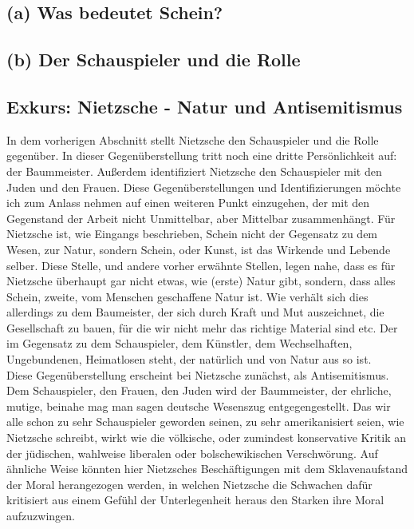 \documentclass[12pt, a4paper, openany]{report}
\begin{document}
\subsection{(a) Was bedeutet Schein?}
\subsection{(b) Der Schauspieler und die Rolle}
\subsection{Exkurs: Nietzsche - Natur und Antisemitismus}
In dem vorherigen Abschnitt stellt Nietzsche den Schauspieler und die Rolle gegenüber. 
In dieser Gegenüberstellung tritt noch eine dritte \glqq Persönlichkeit\grqq{} auf: der Baummeister. 
Außerdem identifiziert Nietzsche den Schauspieler mit den Juden und den Frauen. 
Diese Gegenüberstellungen und Identifizierungen möchte ich zum Anlass nehmen auf einen weiteren Punkt einzugehen, der mit den Gegenstand der Arbeit nicht Unmittelbar, aber Mittelbar zusammenhängt. 
Für Nietzsche ist, wie Eingangs beschrieben, Schein nicht der Gegensatz zu dem Wesen, zur Natur, sondern Schein, oder Kunst, ist das Wirkende und Lebende selber. 
Diese Stelle, und andere vorher erwähnte Stellen, legen nahe, dass es für Nietzsche überhaupt gar nicht etwas, wie (erste) Natur gibt, sondern, dass alles Schein, zweite, vom Menschen geschaffene Natur ist.
Wie verhält sich dies allerdings zu dem Baumeister, der sich durch Kraft und Mut auszeichnet, die Gesellschaft zu bauen, für die \glqq wir\grqq{} nicht mehr das richtige Material sind etc. 
Der im Gegensatz zu dem Schauspieler, dem Künstler, dem Wechselhaften, Ungebundenen, Heimatlosen steht, der \glqq natürlich\grqq{} und \glqq von Natur aus\grqq{} so ist.\\
Diese Gegenüberstellung erscheint bei Nietzsche zunächst, als Antisemitismus. 
Dem Schauspieler, den Frauen, den Juden wird der Baummeister, der ehrliche, mutige, beinahe mag man sagen \glqq deutsche\grqq{} Wesenszug entgegengestellt.
Das wir alle schon zu sehr Schauspieler geworden seinen, zu sehr amerikanisiert seien, wie Nietzsche schreibt, wirkt wie die völkische, oder zumindest konservative  Kritik an der jüdischen, wahlweise liberalen oder bolschewikischen Verschwörung.
Auf ähnliche Weise könnten hier Nietzsches Beschäftigungen mit dem \glqq Sklavenaufstand der Moral\grqq{} herangezogen werden, in welchen Nietzsche die Schwachen dafür kritisiert aus einem Gefühl der Unterlegenheit heraus den Starken ihre Moral aufzuzwingen. 
\end{document}
